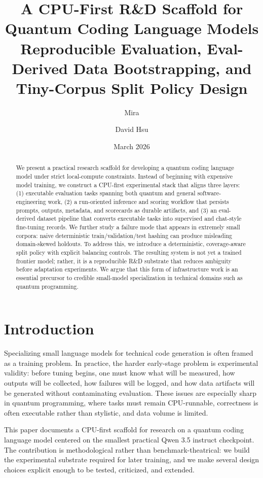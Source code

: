 \documentclass[11pt]{article}
\title{A CPU-First R\&D Scaffold for Quantum Coding Language Models\\
\large Reproducible Evaluation, Eval-Derived Data Bootstrapping, and Tiny-Corpus Split Policy Design}
\author{Mira \and David Hsu}
\date{March 2026}
\begin{document}
\maketitle

\begin{abstract}
We present a practical research scaffold for developing a quantum coding language model under strict local-compute constraints. Instead of beginning with expensive model training, we construct a CPU-first experimental stack that aligns three layers: (1) executable evaluation tasks spanning both quantum and general software-engineering work, (2) a run-oriented inference and scoring workflow that persists prompts, outputs, metadata, and scorecards as durable artifacts, and (3) an eval-derived dataset pipeline that converts executable tasks into supervised and chat-style fine-tuning records. We further study a failure mode that appears in extremely small corpora: naive deterministic train/validation/test hashing can produce misleading domain-skewed holdouts. To address this, we introduce a deterministic, coverage-aware split policy with explicit balancing controls. The resulting system is not yet a trained frontier model; rather, it is a reproducible R\&D substrate that reduces ambiguity before adaptation experiments. We argue that this form of infrastructure work is an essential precursor to credible small-model specialization in technical domains such as quantum programming.
\end{abstract}

\section{Introduction}
Specializing small language models for technical code generation is often framed as a training problem. In practice, the harder early-stage problem is experimental validity: before tuning begins, one must know what will be measured, how outputs will be collected, how failures will be logged, and how data artifacts will be generated without contaminating evaluation. These issues are especially sharp in quantum programming, where tasks must remain CPU-runnable, correctness is often executable rather than stylistic, and data volume is limited.

This paper documents a CPU-first scaffold for research on a quantum coding language model centered on the smallest practical Qwen 3.5 instruct checkpoint. The contribution is methodological rather than benchmark-theatrical: we build the experimental substrate required for later training, and we make several design choices explicit enough to be tested, criticized, and extended.
\end{document}
